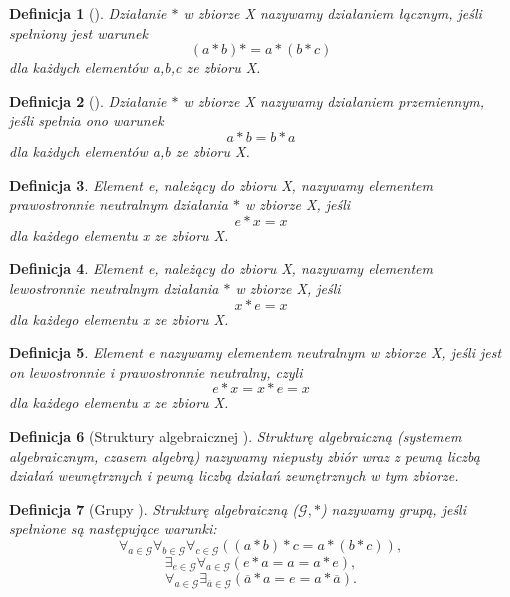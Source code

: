\documentclass[12pt,a4paper]{report}
\newtheorem{definition}{Definicja}
\begin{document}
\begin{definition}[\citep{jedrzejewski2011algebra}]
Działanie $\ast$ w zbiorze X nazywamy działaniem łącznym, jeśli spełniony jest warunek 
\begin{equation*}
(a\ast b)\ast = a\ast(b\ast c)
\end{equation*} 
dla każdych elementów a,b,c ze zbioru X.
\end{definition}
\begin{definition}[\citep{jedrzejewski2011algebra}]
Działanie $\ast$ w zbiorze X nazywamy działaniem przemiennym, jeśli spełnia ono warunek
\begin{equation*}
a\ast b=b\ast a
\end{equation*}
dla każdych elementów a,b ze zbioru X.
\end{definition}
\begin{definition}
Element e, należący do zbioru X, nazywamy elementem prawostronnie neutralnym działania $\ast$ w zbiorze X, jeśli
\begin{equation*}
e\ast x = x
\end{equation*} 
dla każdego elementu x ze zbioru X.
\end{definition}
\begin{definition}
Element e, należący do zbioru X, nazywamy elementem lewostronnie neutralnym działania $\ast$ w zbiorze X, jeśli
\begin{equation*}
x\ast e = x
\end{equation*} 
dla każdego elementu x ze zbioru X.
\end{definition}
\begin{definition}
Element e nazywamy elementem neutralnym w zbiorze X, jeśli jest on lewostronnie i prawostronnie neutralny, czyli
\begin{equation*}
e\ast x = x\ast e = x
\end{equation*}
dla każdego elementu x ze zbioru X.
\end{definition}
\begin{definition}[Struktury algebraicznej \citep{jedrzejewski2011algebra}]
Strukturę algebraiczną (systemem algebraicznym, czasem algebrą) nazywamy niepusty zbiór wraz z pewną liczbą działań wewnętrznych i pewną liczbą działań zewnętrznych w tym zbiorze.
\end{definition}
\begin{definition}[Grupy \citep{jedrzejewski2011algebra}]
Strukturę algebraiczną ($\mathcal{G},\ast$) nazywamy grupą, jeśli spełnione są następujące warunki:
\begin{equation*}
\forall_{a\in \mathcal{G}} \forall_{b\in \mathcal{G}} \forall_{c\in \mathcal{G}} ((a\ast b)\ast c=a\ast (b\ast c)),
\end{equation*}
\begin{equation*}
\exists_{e\in \mathcal{G}} \forall_{a\in \mathcal{G}}(e\ast a=a=a\ast e),
\end{equation*}
\begin{equation*}
\forall_{a \in \mathcal{G}} \exists_{\overline{a}\in\mathcal{G}}(\overline{a}\ast a=e=a\ast \overline{a}).
\end{equation*}
\end{definition}
\end{document}
